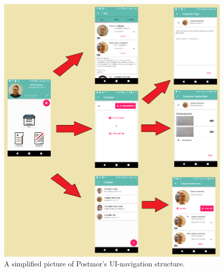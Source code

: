 \documentclass[acmlarge, review=false, screen=true]{acmart}
\begin{document}
      \begin{figure}
        \includegraphics[width=\textwidth]{images/Simplified_structure.png}
        \caption{A simplified picture of Postmor's UI-navigation structure.}
        \label{fig:simplified-nav}
      \end{figure}
\end{document}
